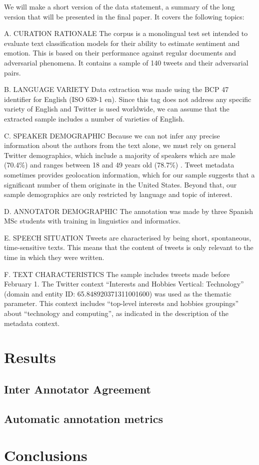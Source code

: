\documentclass[11pt,a4paper]{article}
\begin{document}
We will make a short version of the data statement, a summary of the long version that will be presented in the final paper. It covers the following topics:

A. CURATION RATIONALE
The corpus is a monolingual test set intended to evaluate text classification models for their ability to estimate sentiment and emotion. This is based on their performance against regular documents and adversarial phenomena. It contains a sample of 140 tweets and their adversarial pairs.

B. LANGUAGE VARIETY
Data extraction was made using the BCP 47 identifier for English (ISO 639-1 en). Since this tag does not address any specific variety of English and Twitter is used worldwide, we can assume that the extracted sample includes a number of varieties of English.

C. SPEAKER DEMOGRAPHIC
Because we can not infer any precise information about the authors from the text alone, we must rely on general Twitter demographics, which include a majority of speakers which are male (70.4\%) and ranges between 18 and 49 years old (78.7\%) . Tweet metadata sometimes provides geolocation information, which for our sample suggests that a significant number of them originate in the United States. Beyond that, our sample demographics are only restricted by language and topic of interest.

D. ANNOTATOR DEMOGRAPHIC
The annotation was made by three Spanish MSc students with training in linguistics and informatics.

E. SPEECH SITUATION
Tweets are characterised by being short, spontaneous, time-sensitive texts. This means that the content of tweets is only relevant to the time in which they were written.

F. TEXT CHARACTERISTICS
The sample includes tweets made before February 1. The Twitter context “Interests and Hobbies Vertical: Technology'' (domain and entity ID: 65.848920371311001600) was used as the thematic parameter. This context includes “top-level interests and hobbies groupings” about “technology and computing”, as indicated in the description of the metadata context.

\section{Results}

\subsection{Inter Annotator Agreement}

\subsection{Automatic annotation metrics}

\section{Conclusions}



\end{document}
